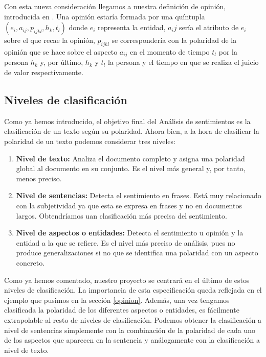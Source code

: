 	Con esta nueva consideración llegamos a nuestra definición de opinión, introducida en \cite{liu}. Una opinión estaría formada por una quíntupla $(e_i, a_{ij}, p_{ijkl}, h_{k}, t_{l})$ donde $e_i$ representa la entidad, $a_ij$ sería el atributo de $e_i$ sobre el que recae la opinión, $p_{ijkl}$ se correspondería con la polaridad de la opinión que se hace sobre el aspecto $a_{ij}$ en el momento de tiempo $t_{l}$ por la persona $h_{k}$ y, por último, $h_{k}$ y $t_{l}$ la persona y el tiempo en que se realiza el juicio de valor respectivamente.
		 
		
	\subsection{Niveles de clasificación}\label{nivelesSA}
	
	
	Como ya hemos introducido, el objetivo final del Análisis de sentimientos es la clasificación de un texto según su polaridad. Ahora bien, a la hora de clasificar la polaridad de un texto podemos considerar tres niveles:
	
	\begin{enumerate}
		\item \textbf{Nivel de texto: } Analiza el documento completo y asigna una polaridad global al documento en su conjunto. Es el nivel más general y, por tanto, menos preciso.
		\item \textbf{Nivel de sentencias: } Detecta el sentimiento en frases. Está muy relacionado con la subjetividad ya que esta se expresa en frases y no en documentos largos. Obtendríamos uan clasificación más precisa del sentimiento.
		\item \textbf{Nivel de aspectos o entidades: } Detecta el sentimiento u opinión y la entidad a la que se refiere. Es el nivel más preciso de análisis, pues no produce generalizaciones si no que se identifica una polaridad con un aspecto concreto.
	\end{enumerate}
	
	 Como ya hemos comentado, nuestro proyecto se centrará en el último de estos niveles de clasificación. La importancia de esta especificación queda reflejada en el ejemplo que pusimos en la sección \ref{opinion}. Además, una vez tengamos clasificada la polaridad de los diferentes aspectos o entidades, es fácilmente extrapolable al resto de niveles de clasificación. Podemos obtener la clasificación a nivel de sentencias simplemente con la combinación de la polaridad de cada uno de los aspectos que aparecen en la sentencia y análogamente con la clasificación a nivel de texto.